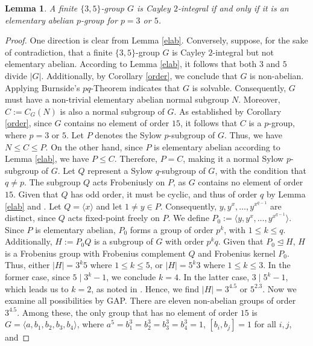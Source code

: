 \documentclass{amsart}
\newtheorem{lem}[thm]{Lemma}
\newtheorem{core}[thm]{Corollary}
\def \leq {\leqslant}
\begin{document}
\begin{lem}\label{3,5}
	A finite $\{3,5\}$-group $G$ is Cayley $2$-integral if and only if it is an elementary abelian $p$-group for $p=3$ or $5$.
\end{lem}
\begin{proof}
One direction is clear from Lemma \ref{elab}. Conversely, suppose, for the sake of contradiction, that a finite $\{3,5\}$-group $G$ is Cayley $2$-integral but not elementary abelian. According to Lemma \ref{elab}, it follows that both $3$ and $5$ divide $|G|$. Additionally, by Corollary \ref{order}, we conclude that $G$ is non-abelian. Applying Burnside's $pq$-Theorem indicates that $G$ is solvable. Consequently, $G$ must have a non-trivial elementary abelian normal subgroup $N$. Moreover, $C:=C_G(N)$ is also a normal subgroup of $G$. As established by Corollary \ref{order}, since $G$ contains no element of order $15$, it follows that $C$ is a $p$-group, where $p=3$ or $5$. Let $P$ denotes the Sylow $p$-subgroup of $G$. Thus, we have $N\leq C\leq P$. On the other hand, since $P$ is elementary abelian according to Lemma \ref{elab}, we have $P\leq C$. Therefore, $P=C$, making it a normal Sylow $p$-subgroup of $G$. Let $Q$ represent a Sylow $q$-subgroup of $G$, with the condition that $q\neq p$. The subgroup $Q$ acts Frobeniusly on $P$, as $G$ contains no element of order $15$. Given that $Q$ has odd order, it must be cyclic, and thus of order $q$ by Lemma \ref{elab} and \cite[10.5.5]{Robinson}. Let $Q=\langle x\rangle$ and let $1\neq y\in P$. Consequently, $y,y^x,\ldots,y^{x^{q-1}}$ are distinct, since $Q$ acts fixed-point freely on $P$. We define $P_0:=\langle y,y^x,\ldots,y^{x^{q-1}}\rangle$. Since $P$ is elementary abelian, $P_0$ forms a group of order $p^k$, with $1\leq k\leq q$. Additionally, $H:=P_0Q$ is a subgroup of $G$ with order $p^kq$. Given that $P_0\unlhd H$, $H$ is a Frobenius group with Frobenius complement $Q$ and Frobenius kernel $P_0$. Thus, either $|H|=3^k5$ where $1\leq k\leq 5$, or $|H|=5^k3$ where $1\leq k\leq 3$. In the former case, since $5\mid 3^k-1$, we conclude $k=4$. In the latter case, $3\mid 5^k-1$, which leads us to $k=2$, as noted in \cite[Exercise 8.5.6]{Robinson}. Hence, we find $|H|=3^4.5$ or $5^2.3$. Now we examine all possibilities by GAP. There are eleven non-abelian groups of order $3^4.5$. Among these, the only group that has no element of order $15$ is $G=\langle a,b_1,b_2,b_3,b_4\rangle$, where $a^5=b_1^3=b_2^3=b_3^3=b_4^3=1$, $[b_i,b_j]=1$ for all $i,j$, and 

\end{proof}
\end{document}
